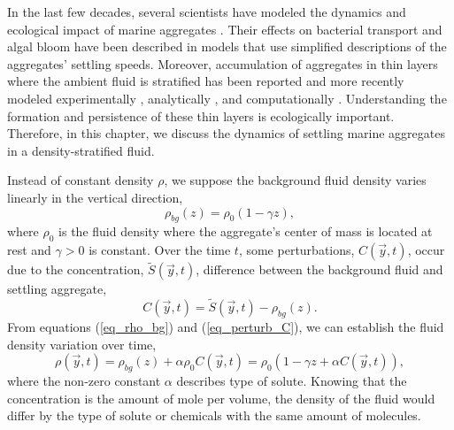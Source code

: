 

In the last few decades, several scientists have modeled the dynamics and ecological impact of marine aggregates \cite{jackson_aggregation_1998, kiorboe_mechanisms_2002}. 
Their effects on bacterial transport \cite{jackson_simulation_1989} and algal bloom \cite{jackson_model_1990} have been described in models that use simplified descriptions of the aggregates' settling speeds. Moreover, accumulation of aggregates in thin layers where the ambient fluid is stratified has been reported \cite{macintyre_accumulation_1995, alldredge_occurrence_2002} and more recently modeled experimentally \cite{prairie_delayed_2013}, analytically \cite{camassa_retention_2013}, and computationally \cite{panah_simulations_2017}. Understanding the formation and persistence of these thin layers is ecologically important. 
Therefore, in this chapter, we discuss the dynamics of settling marine aggregates in a density-stratified fluid. 
\par
Instead of constant density $\rho$, we suppose the background fluid density varies linearly in the vertical direction,
\begin{equation}
\rho_{bg}(z) =  \rho_0 \left(1 - \gamma z \right),
\label{eq_rho_bg}
\end{equation}
where $\rho_0$ is the fluid density where the aggregate's center of mass is located at rest and $\gamma > 0$ is constant.
Over the time $t$, some perturbations, $C(\vec{y},t)$, occur due to the concentration, $\tilde{S}(\vec{y},t)$, difference between the background fluid and settling aggregate,
\begin{equation}
C(\vec{y}, t) =  \tilde{S}(\vec{y},t) - \rho_{bg}(z).
\label{eq_perturb_C}
\end{equation}
From equations (\ref{eq_rho_bg}) and (\ref{eq_perturb_C}), we can establish the fluid density variation over time,
\begin{equation}
	\rho(\vec{y},t ) 
	= \rho_{bg}(z) +  \alpha \rho_0 C(\vec{y},t) 
	 = \rho_0 \left( 1 - \gamma z  + \alpha  C(\vec{y},t) \right),
\label{eq_density}
\end{equation}
where the non-zero constant $\alpha $ describes type of solute. Knowing that the concentration is the amount of mole per volume, the density of the fluid would differ by the type of solute or chemicals with the same amount of molecules.
